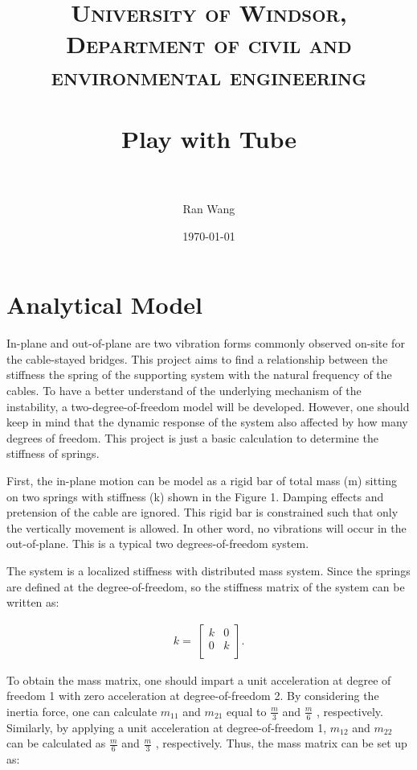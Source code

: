 \documentclass[paper=a4, fontsize=11pt]{scrartcl} %
\title{
\normalfont \normalsize
\textsc{University of Windsor, Department of civil and environmental engineering} \\ [25pt] %
\horrule{0.5pt} \\[0.4cm] %
\huge Play with Tube \\ %
\horrule{2pt} \\[0.5cm] %
}
\author{Ran Wang} %
\date{\normalsize\today} %
\numberwithin{equation}{section} %
\numberwithin{figure}{section} %
\numberwithin{table}{section} %
\begin{document}
\maketitle %


\section{Analytical Model}

In-plane and out-of-plane are two vibration forms commonly observed
on-site for the cable-stayed bridges. This project aims to find a
relationship between the stiffness the spring of the supporting system
with the natural frequency of the cables. To have a better understand
of the underlying mechanism of the instability, a
two-degree-of-freedom model will be developed. However, one should
keep in mind that the dynamic response of the system also affected by
how many degrees of freedom. This project is just a basic calculation
to determine the stiffness of springs.

First, the in-plane motion can be model as a rigid bar of total mass (m)
sitting on two springs with stiffness (k) shown in the Figure 1. Damping
effects and pretension of the cable are ignored. This rigid bar is
constrained such that only the vertically movement is allowed. In
other word, no vibrations will occur in the out-of-plane. This is a
typical two degrees-of-freedom system.

The system is a localized stiffness with distributed mass system.
Since the springs are defined at the degree-of-freedom, so the
stiffness matrix of the system can be written as:

\begin{align}
  k=\ \left[\begin{matrix}k&0\\0&k\\\end{matrix}\right].
\end{align}

To obtain the mass matrix, one should impart a unit acceleration at
degree of freedom 1 with zero acceleration at degree-of-freedom 2. By
considering the inertia force, one can calculate $m_{11}$ and $m_{21}$
equal to $\frac{m}{3}$ and $\frac{m}{6}$ , respectively. Similarly, by
applying a unit acceleration at degree-of-freedom 1, $m_{12}$ and $m_{22}$
can be calculated as $\frac{m}{6}$ and $\frac{m}{3}$ , respectively. Thus,
the mass matrix can be set up as:
\end{document}
